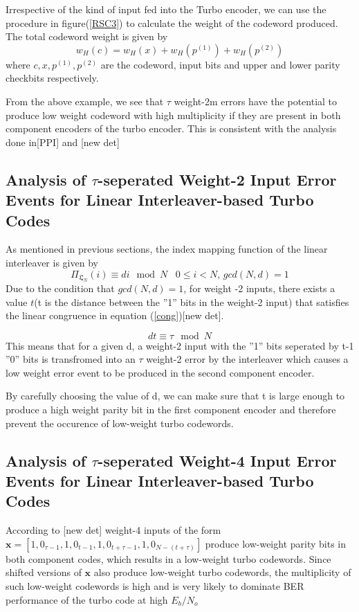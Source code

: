 \documentclass[20 pts]{article}
\begin{document}
Irrespective of the kind of input fed into the Turbo encoder, we can use the procedure
in figure(\ref{RSC3})  to calculate the weight of the codeword produced.
The total codeword weight is given by 
\begin{equation}
\label{hamm}
w_H(c)= w_H(x)+w_H(p^{(1)})+w_H(p^{(2)})
\end{equation}
where $c,x,p^{(1)},p^{(2)}$ are the codeword, input bits and upper and lower
parity checkbits respectively.

From the above example, we see that $\tau$ weight-2m errors have the potential to
produce low weight codeword with high multiplicity if they are present in both 
component encoders of the turbo encoder. This is consistent with the analysis done
in[PPI] and [new det]

\subsection{Analysis of $\tau$-seperated Weight-2 Input Error Events for 
Linear Interleaver-based Turbo Codes}
As mentioned in previous sections, the index mapping function of the linear interleaver
is given by 
$$ \Pi_{\mathfrak{L}_N}(i) \equiv di \mod N \,\,\,\,\, 0 \leq i < N, \, gcd(N,d)=1$$
 Due to the condition that $gcd(N,d)=1$, for weight -2 inputs,
 there exists a value $t$(t is the distance between the ''1'' bits in the weight-2 input) 
 that satisfies the linear congruence in equation (\ref{cong})[new det].
 
 \begin{equation} 
 dt \equiv \tau \mod N
 \label{cong}
 \end{equation}
 This means that for a given d, a weight-2 input with the ''1'' bits seperated by t-1
 ''0'' bits is transfromed into an $\tau$ weight-2 error by the interleaver which causes
 a low weight error event to be produced in the second component encoder.
 
By carefully choosing the value of d, we can make sure that  t is large enough
to produce a high weight parity bit in the first component encoder and therefore
 prevent the occurence of low-weight turbo codewords. 
 
 \subsection{Analysis of $\tau$-seperated Weight-4 Input Error Events for 
Linear Interleaver-based Turbo Codes}
 According to [new det]
 weight-4 inputs of the form 
 $\mathbf{x}=[1 ,0_{\tau-1},1,0_{t-1},1,0_{t+\tau-1},1,0_{N-(t+\tau)}]$
 produce low-weight parity bits in both component codes, which results in a
  low-weight turbo codewords. Since shifted versions of $\mathbf{x}$ also produce
  low-weight turbo codewords, the multiplicity of such low-weight codewords is
  high and is very likely to dominate BER performance of the turbo code
  at high $E_b/N_o$
  
\end{document}
